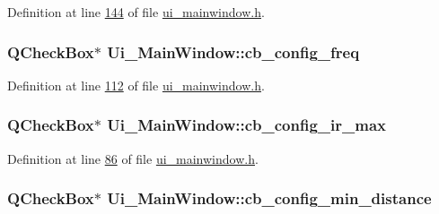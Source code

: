 Definition at line \hyperlink{a00139_source_l00144}{144} of file \hyperlink{a00139_source}{ui\+\_\+mainwindow.\+h}.

\hypertarget{a00080_a8f501acefacd6343a4ec99a67172f256}{
\subsubsection[{cb\+\_\+config\+\_\+freq}]{\setlength{\rightskip}{0pt plus 5cm}Q\+Check\+Box$\ast$ Ui\+\_\+\+Main\+Window\+::cb\+\_\+config\+\_\+freq}}\label{a00080_a8f501acefacd6343a4ec99a67172f256}


Definition at line \hyperlink{a00139_source_l00112}{112} of file \hyperlink{a00139_source}{ui\+\_\+mainwindow.\+h}.

\hypertarget{a00080_ae78fd3c777d081ab1ec1d0142bec3320}{
\subsubsection[{cb\+\_\+config\+\_\+ir\+\_\+max}]{\setlength{\rightskip}{0pt plus 5cm}Q\+Check\+Box$\ast$ Ui\+\_\+\+Main\+Window\+::cb\+\_\+config\+\_\+ir\+\_\+max}}\label{a00080_ae78fd3c777d081ab1ec1d0142bec3320}


Definition at line \hyperlink{a00139_source_l00086}{86} of file \hyperlink{a00139_source}{ui\+\_\+mainwindow.\+h}.

\hypertarget{a00080_a6b0d09f3b380fdb810d3da3f5208ccf5}{
\subsubsection[{cb\+\_\+config\+\_\+min\+\_\+distance}]{\setlength{\rightskip}{0pt plus 5cm}Q\+Check\+Box$\ast$ Ui\+\_\+\+Main\+Window\+::cb\+\_\+config\+\_\+min\+\_\+distance}}\label{a00080_a6b0d09f3b380fdb810d3da3f5208ccf5}


